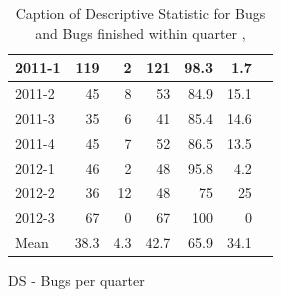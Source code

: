 \documentclass[UKenglish]{ifimaster}  %
\begin{document}
\begin{appendices}
\begin{table}[!htbp]
\begin{adjustwidth}{-2.5cm}{}
\begin{subfigure}[b]{0.4\textwidth}
{\begin{tabular}{ | l | r | r | r | r | r | r | }
	2011-1 & 119 & 2 & 121 & 98.3 & 1.7 \\ \hline
	2011-2 & 45 & 8 & 53 & 84.9 & 15.1 \\ \hline
	2011-3 & 35 & 6 & 41 & 85.4 & 14.6 \\ \hline
	2011-4 & 45 & 7 & 52 & 86.5 & 13.5 \\ \hline
	2012-1 & 46 & 2 & 48 & 95.8 & 4.2 \\ \hline
	2012-2 & 36 & 12 & 48 & 75 & 25 \\ \hline
	2012-3 & 67 & 0 & 67 & 100 & 0 \\ \hline
	Mean & 38.3 & 4.3 & 42.7 & 65.9 & 34.1  \\ \hline
\end{tabular}
}
\caption{DS - Bugs per quarter}
 \label{DS:FTPQ:7}
\end{subfigure}
\end{adjustwidth}
\caption[Optional caption for list of figures]{Caption of Descriptive Statistic for Bugs and Bugs finished within quarter  , }
\label{DS:7:5} %
\end{table}


\end{appendices}
\end{document}
